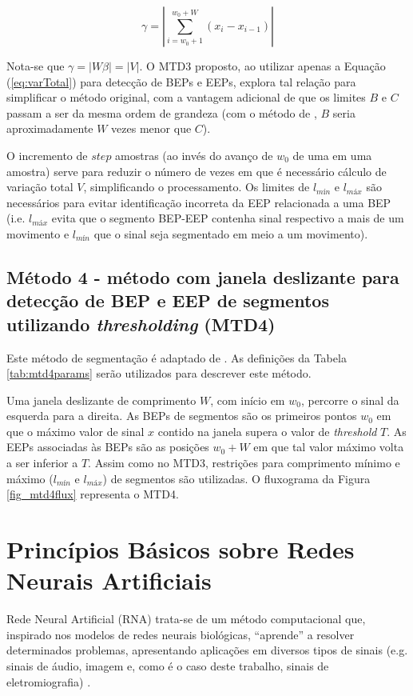 \begin{equation}
	\label{eq:absVarTotal}
	\gamma = \left|\sum\limits_{i=w_0+1}^{w_0+W} (x_i - x_{i-1})\right|
\end{equation}

Nota-se que $\gamma = |W\beta| = |V|$. O MTD3 proposto, ao utilizar apenas a Equação (\ref{eq:varTotal}) para detecção de BEPs e EEPs, explora tal relação para simplificar o método original, com a vantagem adicional de que os limites $B$ e $C$ passam a ser da mesma ordem de grandeza (com o método de , $B$ seria aproximadamente $W$ vezes menor que $C$).

O incremento de $step$ amostras (ao invés do avanço de $w_0$ de uma em uma amostra) serve para reduzir o número de vezes em que é necessário cálculo de variação total $V$, simplificando o processamento. Os limites de $l_{mín}$ e $l_{máx}$ são necessários para evitar identificação incorreta da EEP relacionada a uma BEP (i.e. $l_{máx}$ evita que o segmento BEP-EEP contenha sinal respectivo a mais de um movimento e $l_{mín}$ que o sinal seja segmentado em meio a um movimento).

			\subsection{Método 4 - método com janela deslizante para detecção de BEP e EEP de segmentos utilizando \emph{thresholding} (MTD4)}
Este método de segmentação é adaptado de . As definições da Tabela \ref{tab:mtd4params} serão utilizados para descrever este método.




Uma janela deslizante de comprimento $W$, com início em $w_0$, percorre o sinal da esquerda para a direita. As BEPs de segmentos são os primeiros pontos $w_0$ em que o máximo valor de sinal $x$ contido na janela supera o valor de \emph{threshold} $T$. As EEPs associadas às BEPs são as posições $w_0 + W$ em que tal valor máximo volta a ser inferior a $T$. Assim como no MTD3, restrições para comprimento mínimo e máximo ($l_{mín}$ e $l_{máx}$) de segmentos são utilizadas. O fluxograma da Figura \ref{fig_mtd4flux} representa o MTD4.

		\section{Princípios Básicos sobre Redes Neurais Artificiais}
Rede Neural Artificial (RNA) trata-se de um método computacional que, inspirado nos modelos de redes neurais biológicas, ``aprende'' a resolver determinados problemas, apresentando aplicações em diversos tipos de sinais (e.g. sinais de áudio, imagem e, como é o caso deste trabalho, sinais de eletromiografia) \cite{YEGNANARAYANA2009}.

